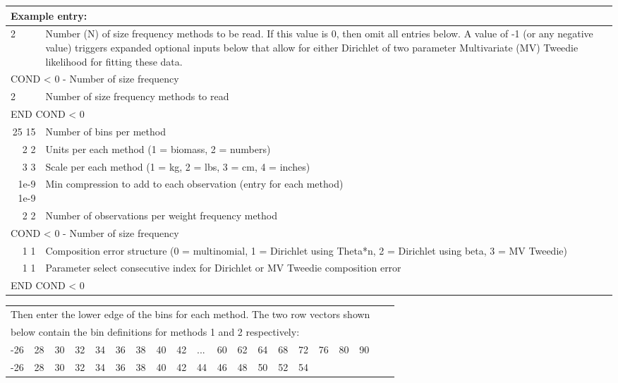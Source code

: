 \begin{center}
	\begin{tabular}{p{1.4cm} p{0.7cm} p{12.8 cm}}
		\multicolumn{3}{l}{Example entry:}\\
		\hline
		2 &  & Number (N) of size frequency methods to be read. If this value is 0, then omit all entries below. A value of -1 (or any negative value) triggers expanded optional inputs below that allow for either Dirichlet of two parameter Multivariate (MV) Tweedie likelihood for fitting these data. \Tstrut\Bstrut\\
		\hline
		\multicolumn{3}{l}{COND < 0 - Number of size frequency }  \Tstrut\\
		\multicolumn{2}{l}{2} & Number of size frequency methods to read \Tstrut\\
		\multicolumn{3}{l}{END COND < 0}  \Bstrut\\
		\hline
		\multicolumn{2}{r}{25 15} & Number of bins per method\Tstrut\\
		\multicolumn{2}{r}{2 2} & Units per each method (1 = biomass, 2 = numbers)\\
		\multicolumn{2}{r}{3 3} & Scale per each method (1 = kg, 2 = lbs, 3 = cm, 4 = inches)\\
		\multicolumn{2}{r}{1e-9 1e-9} & Min compression to add to each observation (entry for each method)\\
		\multicolumn{2}{r}{2 2} & Number of observations per weight frequency method \Bstrut\\
		\hline
		\multicolumn{3}{l}{COND < 0 - Number of size frequency }  \Tstrut\\
		\multicolumn{2}{r}{1 1} & Composition error structure (0 = multinomial, 1 = Dirichlet using Theta*n, 2 = Dirichlet using beta, 3 = MV Tweedie)\Tstrut\\
		\multicolumn{2}{r}{1 1} & Parameter select consecutive index for Dirichlet or MV Tweedie composition error\Bstrut\\
		\multicolumn{3}{l}{END COND < 0}  \Tstrut\\
		\hline
	\end{tabular}
\end{center}

\begin{center}
	\begin{tabular}{p{0.4cm} p{0.4cm} p{0.4cm} p{0.4cm} p{0.4cm} p{0.4cm} p{0.5cm} p{0.5cm} p{0.5cm} p{0.5cm} p{0.5cm} p{0.5cm} p{0.5cm} p{0.5cm} p{0.5cm} p{0.5cm} p{0.5cm} p{0.5cm} p{0.5cm} p{0.25cm}}
		\multicolumn{18}{l}{Then enter the lower edge of the bins for each method. The two row vectors shown}\\
		\multicolumn{18}{l}{below contain the bin definitions for methods 1 and 2 respectively:}\\
		\hline
		-26 & 28 & 30 & 32 & 34 & 36 & 38 & 40 & 42 & ... & 60 & 62 & 64 & 68 & 72 & 76 & 80 & 90\Tstrut\\
		-26 & 28 & 30 & 32 & 34 & 36 & 38 & 40 & 42 &  44 & 46 & 48 & 50 & 52 & \multicolumn{4}{l}{54} \
		\Bstrut\\
		\hline 
	\end{tabular}
\end{center}

